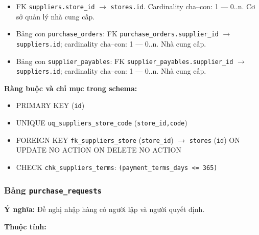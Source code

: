 \begin{itemize}

\item FK \texttt{suppliers.store\_id} $\rightarrow$ \texttt{stores.id}. Cardinality cha--con: 1 — 0..n. Cơ sở quản lý nhà cung cấp.

\item Bảng con \texttt{purchase\_orders}: FK \texttt{purchase\_orders.supplier\_id} $\rightarrow$ \texttt{suppliers.id}; cardinality cha--con: 1 — 0..n. Nhà cung cấp.

\item Bảng con \texttt{supplier\_payables}: FK \texttt{supplier\_payables.supplier\_id} $\rightarrow$ \texttt{suppliers.id}; cardinality cha--con: 1 — 0..n. Nhà cung cấp.

\end{itemize}

\textbf{Ràng buộc và chỉ mục trong schema:}

\begin{itemize}

\item PRIMARY KEY (\texttt{id})

\item UNIQUE \texttt{uq\_suppliers\_store\_code} (\texttt{store\_id,code})

\item FOREIGN KEY \texttt{fk\_suppliers\_store} (\texttt{store\_id}) $\rightarrow$ \texttt{stores} (\texttt{id}) ON UPDATE NO ACTION ON DELETE NO ACTION

\item CHECK \texttt{chk\_suppliers\_terms}: \texttt{(payment\_terms\_days <= 365)}

\end{itemize}

\subsubsection{Bảng \texttt{purchase\_requests}}

\textbf{Ý nghĩa:} Đề nghị nhập hàng có người lập và người quyết định.\par

\textbf{Thuộc tính:}

